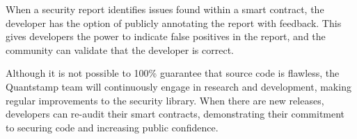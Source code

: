 \documentclass{llncs}
\begin{document}
When a security report identifies issues found within a smart contract, the developer has the option of publicly annotating the report with feedback. This gives developers the power to indicate false positives in the report, and the community can validate that the developer is correct.

Although it is not possible to 100\% guarantee that source code is flawless, the Quantstamp team will continuously engage in research and development, making regular improvements to the security library. When there are new releases, developers can re-audit their smart contracts, demonstrating their commitment to securing code and increasing public confidence.




\end{document}
